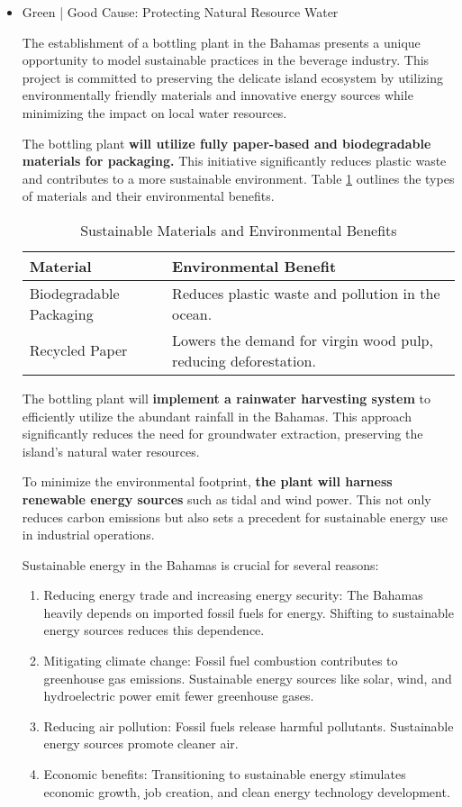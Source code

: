 \documentclass{article}
\begin{document}
\begin{itemize}
  \item Green | Good Cause: Protecting Natural Resource Water\par
  The establishment of a bottling plant in the Bahamas presents a unique opportunity to model sustainable practices in the beverage industry. This project is committed to preserving the delicate island ecosystem by utilizing environmentally friendly materials and innovative energy sources while minimizing the impact on local water resources.\par
  The bottling plant \textbf{will utilize fully paper-based and biodegradable materials for packaging.} This initiative significantly reduces plastic waste and contributes to a more sustainable environment. Table \ref{tab:material_use} outlines the types of materials and their environmental benefits.\par
  \begin{table}[H]
\centering
\caption{Sustainable Materials and Environmental Benefits}
\label{tab:material_use}
\begin{tabular}{|l|p{8cm}|}
\hline
\textbf{Material} & \textbf{Environmental Benefit} \\
\hline
Biodegradable Packaging & Reduces plastic waste and pollution in the ocean. \\
\hline
Recycled Paper & Lowers the demand for virgin wood pulp, reducing deforestation. \\
\hline
\end{tabular}
\end{table}
The bottling plant will \textbf{implement a rainwater harvesting system }to efficiently utilize the abundant rainfall in the Bahamas. This approach significantly reduces the need for groundwater extraction, preserving the island's natural water resources.\par
To minimize the environmental footprint, \textbf{the plant will harness renewable energy sources }such as tidal and wind power. This not only reduces carbon emissions but also sets a precedent for sustainable energy use in industrial operations.\par

Sustainable energy in the Bahamas is crucial for several reasons:

\begin{enumerate}
    \item Reducing energy trade and increasing energy security: The Bahamas heavily depends on imported fossil fuels for energy. Shifting to sustainable energy sources reduces this dependence.
    \item Mitigating climate change: Fossil fuel combustion contributes to greenhouse gas emissions. Sustainable energy sources like solar, wind, and hydroelectric power emit fewer greenhouse gases.
    \item Reducing air pollution: Fossil fuels release harmful pollutants. Sustainable energy sources promote cleaner air.
    \item Economic benefits: Transitioning to sustainable energy stimulates economic growth, job creation, and clean energy technology development.
\end{enumerate}


\end{itemize}
\end{document}
